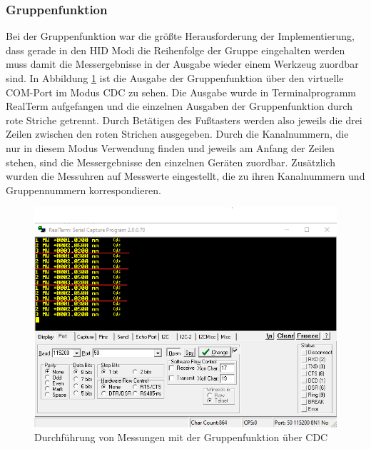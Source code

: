 \subsubsection{Gruppenfunktion}
Bei der Gruppenfunktion war die größte Herausforderung der Implementierung, dass gerade in den HID Modi die Reihenfolge der Gruppe eingehalten werden muss damit die Messergebnisse in der Ausgabe wieder einem Werkzeug zuordbar sind. In Abbildung \ref{fig:MessungenGruppenfunktionCDC} ist die Ausgabe der Gruppenfunktion über den virtuelle COM-Port im Modus CDC zu sehen. Die Ausgabe wurde in Terminalprogramm RealTerm aufgefangen und die einzelnen Ausgaben der Gruppenfunktion durch rote Striche getrennt. Durch Betätigen des Fußtasters werden also jeweils die drei Zeilen zwischen den roten Strichen ausgegeben. Durch die Kanalnummern, die nur in diesem Modus Verwendung finden und jeweils am Anfang der Zeilen stehen, sind die Messergebnisse den einzelnen Geräten zuordbar. Zusätzlich wurden die Messuhren auf Messwerte eingestellt, die zu ihren Kanalnummern und Gruppennummern korrespondieren. 
\begin{figure}[H] 
	\centering
	\includegraphics[width=\textwidth]{figures/GroupFeature.png}
	\caption{Durchführung von Messungen mit der Gruppenfunktion über CDC}
	\label{fig:MessungenGruppenfunktionCDC}
\end{figure}

